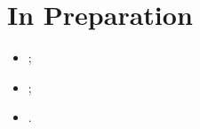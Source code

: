 \documentclass[a4paper]{article}
\begin{document}
  
  \section*{In Preparation}
	  \begin{itemize}
    	\item {};
		\item {};
    	\item {}.
	  \end{itemize}


  
\end{document}
